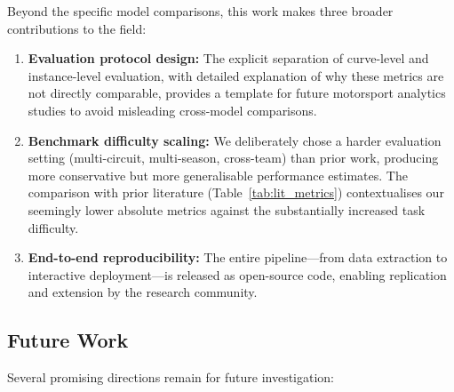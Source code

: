 \documentclass[journal,twoside]{IEEEtran}
\begin{document}
Beyond the specific model comparisons, this work makes three broader
contributions to the field:

\begin{enumerate}
  \item \textbf{Evaluation protocol design:}  The explicit separation
  of curve-level and instance-level evaluation, with detailed
  explanation of why these metrics are not directly comparable, provides
  a template for future motorsport analytics studies to avoid
  misleading cross-model comparisons.

  \item \textbf{Benchmark difficulty scaling:}  We deliberately chose a
  harder evaluation setting (multi-circuit, multi-season, cross-team)
  than prior work, producing more conservative but more generalisable
  performance estimates.  The comparison with prior literature
  (Table~\ref{tab:lit_metrics}) contextualises our seemingly lower
  absolute metrics against the substantially increased task difficulty.

  \item \textbf{End-to-end reproducibility:}  The entire pipeline---from
  data extraction to interactive deployment---is released as open-source
  code, enabling replication and extension by the research community.
\end{enumerate}

\subsection{Future Work}

Several promising directions remain for future investigation:
\end{document}
